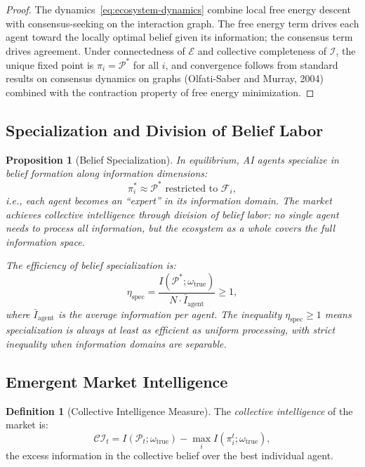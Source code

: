 \documentclass[12pt,a4paper]{article}
\newtheorem{proposition}[theorem]{Proposition}
\theoremstyle{definition}
\newtheorem{definition}[theorem]{Definition}
\newcommand{\F}{\mathcal{F}}
\newcommand{\PP}{\mathcal{P}}
\begin{document}
\begin{proof}
The dynamics~\eqref{eq:ecosystem-dynamics} combine local free energy descent with consensus-seeking on the interaction graph. The free energy term drives each agent toward the locally optimal belief given its information; the consensus term drives agreement. Under connectedness of $\mathcal{E}$ and collective completeness of $\mathcal{I}$, the unique fixed point is $\pi_i = \PP^*$ for all $i$, and convergence follows from standard results on consensus dynamics on graphs (Olfati-Saber and Murray, 2004) combined with the contraction property of free energy minimization.
\end{proof}

\subsection{Specialization and Division of Belief Labor}

\begin{proposition}[Belief Specialization]\label{prop:specialization}
In equilibrium, AI agents specialize in belief formation along information dimensions:
\begin{equation}
  \pi_i^* \approx \PP^* \text{ restricted to } \F_i,
\end{equation}
i.e., each agent becomes an ``expert'' in its information domain. The market achieves collective intelligence through \emph{division of belief labor}: no single agent needs to process all information, but the ecosystem as a whole covers the full information space.

The efficiency of belief specialization is:
\begin{equation}
  \eta_{\mathrm{spec}} = \frac{I(\PP^*; \omega_{\mathrm{true}})}{N \cdot \bar{I}_{\mathrm{agent}}} \geq 1,
\end{equation}
where $\bar{I}_{\mathrm{agent}}$ is the average information per agent. The inequality $\eta_{\mathrm{spec}} \geq 1$ means specialization is always at least as efficient as uniform processing, with strict inequality when information domains are separable.
\end{proposition}

\subsection{Emergent Market Intelligence}

\begin{definition}[Collective Intelligence Measure]\label{def:collective-intelligence}
The \emph{collective intelligence} of the market is:
\begin{equation}
  \mathcal{CI}_t = I(\PP_t; \omega_{\mathrm{true}}) - \max_i I(\pi_i^t; \omega_{\mathrm{true}}),
\end{equation}
the excess information in the collective belief over the best individual agent.
\end{definition}
\end{document}
